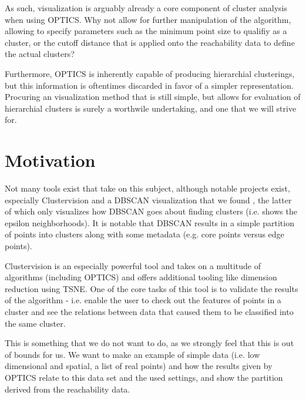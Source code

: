 \documentclass{vgtc}                          %
\begin{document}
\begin{flushleft}
As such, visualization is arguably already a core component of cluster analysis when using OPTICS. Why not allow for further manipulation of the algorithm, allowing to specify parameters such as the minimum point size to qualifiy as a cluster, or the cutoff distance that is applied onto the reachability data to define the actual clusters?
\end{flushleft}

\begin{flushleft}
Furthermore, OPTICS is inherently capable of producing hierarchial clusterings, but this information is oftentimes discarded in favor of a simpler representation. Procuring an visualization method that is still simple, but allows for evaluation of hierarchial clusters is surely a worthwile undertaking, and one that we will strive for. 
\end{flushleft}

\section{Motivation}

\begin{flushleft}
 Not many tools exist that take on this subject, although notable projects exist, especially Clustervision\cite{Clustervision} and a DBSCAN visualization that we found \cite{DBSCAN}, the latter of which only visualizes how DBSCAN goes about finding clusters (i.e. shows the epsilon neighborhoods). It is notable that DBSCAN results in a simple partition of points into clusters along with some metadata (e.g. core points versus edge points).
\end{flushleft}

\begin{flushleft}
Clustervision is an especially powerful tool and takes on a multitude of algorithms (including OPTICS) and offers additional tooling like dimension reduction using TSNE. One of the core tasks of this tool is to validate the results of the algorithm - i.e. enable the user to check out the features of points in a cluster and see the relations between data that caused them to be classified into the same cluster.
\end{flushleft}

\begin{flushleft}
This is something that we do not want to do, as we strongly feel that this is out of bounds for us. We want to make an example of simple data (i.e. low dimensional and spatial, a list of real points) and how the results given by OPTICS relate to this data set and the used settings, and show the partition derived from the reachability data. 
\end{flushleft}
\end{document}
